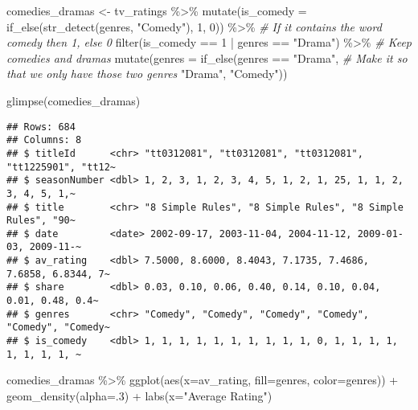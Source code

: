 \documentclass[
]{article}
\newenvironment{Shaded}{\begin{snugshade}}{\end{snugshade}}
\newcommand{\AttributeTok}[1]{\textcolor[rgb]{0.77,0.63,0.00}{#1}}
\newcommand{\CommentTok}[1]{\textcolor[rgb]{0.56,0.35,0.01}{\textit{#1}}}
\newcommand{\DecValTok}[1]{\textcolor[rgb]{0.00,0.00,0.81}{#1}}
\newcommand{\FunctionTok}[1]{\textcolor[rgb]{0.00,0.00,0.00}{#1}}
\newcommand{\NormalTok}[1]{#1}
\newcommand{\OtherTok}[1]{\textcolor[rgb]{0.56,0.35,0.01}{#1}}
\newcommand{\SpecialCharTok}[1]{\textcolor[rgb]{0.00,0.00,0.00}{#1}}
\newcommand{\StringTok}[1]{\textcolor[rgb]{0.31,0.60,0.02}{#1}}
\begin{document}
\begin{Shaded}
\begin{Highlighting}[]
\NormalTok{comedies\_dramas }\OtherTok{\textless{}{-}}\NormalTok{ tv\_ratings }\SpecialCharTok{\%\textgreater{}\%} 
  \FunctionTok{mutate}\NormalTok{(}\AttributeTok{is\_comedy =} \FunctionTok{if\_else}\NormalTok{(}\FunctionTok{str\_detect}\NormalTok{(genres, }\StringTok{"Comedy"}\NormalTok{), }
                             \DecValTok{1}\NormalTok{, }
                             \DecValTok{0}\NormalTok{)) }\SpecialCharTok{\%\textgreater{}\%} \CommentTok{\# If it contains the word comedy then 1, else 0}
  \FunctionTok{filter}\NormalTok{(is\_comedy }\SpecialCharTok{==} \DecValTok{1} \SpecialCharTok{|}\NormalTok{ genres }\SpecialCharTok{==} \StringTok{"Drama"}\NormalTok{) }\SpecialCharTok{\%\textgreater{}\%} \CommentTok{\# Keep comedies and dramas}
  \FunctionTok{mutate}\NormalTok{(}\AttributeTok{genres =} \FunctionTok{if\_else}\NormalTok{(genres }\SpecialCharTok{==} \StringTok{"Drama"}\NormalTok{, }\CommentTok{\# Make it so that we only have those two genres}
                          \StringTok{"Drama"}\NormalTok{, }
                          \StringTok{"Comedy"}\NormalTok{))}

\FunctionTok{glimpse}\NormalTok{(comedies\_dramas)}
\end{Highlighting}
\end{Shaded}

\begin{verbatim}
## Rows: 684
## Columns: 8
## $ titleId      <chr> "tt0312081", "tt0312081", "tt0312081", "tt1225901", "tt12~
## $ seasonNumber <dbl> 1, 2, 3, 1, 2, 3, 4, 5, 1, 2, 1, 25, 1, 1, 2, 3, 4, 5, 1,~
## $ title        <chr> "8 Simple Rules", "8 Simple Rules", "8 Simple Rules", "90~
## $ date         <date> 2002-09-17, 2003-11-04, 2004-11-12, 2009-01-03, 2009-11-~
## $ av_rating    <dbl> 7.5000, 8.6000, 8.4043, 7.1735, 7.4686, 7.6858, 6.8344, 7~
## $ share        <dbl> 0.03, 0.10, 0.06, 0.40, 0.14, 0.10, 0.04, 0.01, 0.48, 0.4~
## $ genres       <chr> "Comedy", "Comedy", "Comedy", "Comedy", "Comedy", "Comedy~
## $ is_comedy    <dbl> 1, 1, 1, 1, 1, 1, 1, 1, 1, 1, 0, 1, 1, 1, 1, 1, 1, 1, 1, ~
\end{verbatim}

\begin{Shaded}
\begin{Highlighting}[]
\NormalTok{comedies\_dramas }\SpecialCharTok{\%\textgreater{}\%} 
  \FunctionTok{ggplot}\NormalTok{(}\FunctionTok{aes}\NormalTok{(}\AttributeTok{x=}\NormalTok{av\_rating,}
             \AttributeTok{fill=}\NormalTok{genres,}
             \AttributeTok{color=}\NormalTok{genres)) }\SpecialCharTok{+}
  \FunctionTok{geom\_density}\NormalTok{(}\AttributeTok{alpha=}\NormalTok{.}\DecValTok{3}\NormalTok{) }\SpecialCharTok{+}
  \FunctionTok{labs}\NormalTok{(}\AttributeTok{x=}\StringTok{"Average Rating"}\NormalTok{)}
\end{Highlighting}
\end{Shaded}
\end{document}
